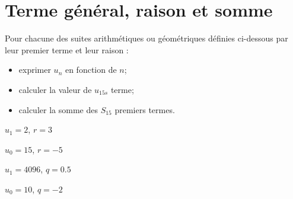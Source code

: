 %	
%	
%	
%	
%	


\section{Terme général, raison et somme}

Pour chacune des suites arithmétiques ou géométriques définies ci-dessous par leur premier terme et leur raison :
\begin{itemize}
	\item exprimer $u_n$ en fonction de $n$;
	\item calculer la valeur de $u_{15s}$ terme;
	\item calculer la somme des $S_{15}$ premiers termes.
	
\end{itemize} 
\begin{questions}
	
	
	\question[2\half] $u_1 = 2$, $r= 3$
	
	\fillwithdottedlines{8cm}
	
	
	\question[2\half] $u_0 = 15$, $r= -5$
	
	\fillwithdottedlines{8cm}
	
	\question[2\half] $u_1 = 4096$, $q=\num{0.5}$
	
	\fillwithdottedlines{9cm}
	
	\question[2\half] $u_0 = 10$, $q=\num{-2}$
	
	\fillwithdottedlines{9cm}
\end{questions}

